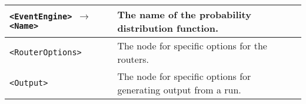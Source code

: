 {\begin{longtable}{ | p{7.5cm} | p{6.5cm} | }
\hline 
\footnotesize{\texttt{<EventEngine> $\rightarrow$ <Name>}} &
The name of the probability distribution function. \\
\hline
\hline


\hline
\footnotesize{\texttt{<RouterOptions>}} &
The node for specific options for  the routers. \\
\hline \hline


\hline
\footnotesize{\texttt{<Output>}} &
The node for specific options for  generating output from a run. \\
\hline

\end{longtable}


\normalsize

}
